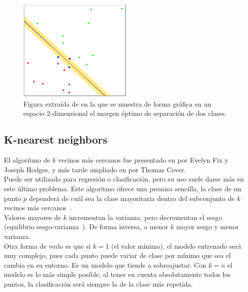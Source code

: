 \begin{figure}[H]
    \begin{center}
        \includegraphics[width=0.5\textwidth]{imagenes/svm-margin.png}
    \end{center}
    \caption[Margen en SVM]{Figura extraída de \cite{hastie2009elements} en la que se muestra de forma gráfica en un espacio $2$-dimensional el margen óptimo de separación de dos clases.}
\end{figure}

\subsection{K-nearest neighbors}
El algoritmo de $k$ vecinos más cercanos fue presentado en \cite{fix_discriminatory_1989} por Evelyn Fix y Joseph Hodges, y más tarde ampliado en \cite{cover_nearest_1967} por Thomas Cover.\\[6pt]
Puede ser utilizado para regresión o clasificación, pero su uso suele darse más en este último problema. Este algoritmo ofrece una premisa sencilla, la clase de un punto $p$ dependerá de cuál sea la clase mayoritaria dentro del subconjunto de $k$ vecinos más cercanos~\cite{10.1007/978-3-540-39964-3_62}.\\[6pt]
Valores mayores de $k$ incrementan la varianza, pero decrementan el sesgo (equilibrio sesgo-varianza~\cite{Mostafa2012}). De forma inversa, a menor $k$ mayor sesgo y menor varianza.\\[6pt]
Otra forma de verlo es que si $k=1$ (el valor mínimo), el modelo entrenado será muy complejo, pues cada punto puede variar de clase por mínimo que sea el cambia en su entorno. Es un modelo que tiende a sobreajustar. Con $k=n$ el modelo es lo más simple posible, al tener en cuenta absolutamente todos los puntos, la clasificación será siempre la de la clase más repetida.